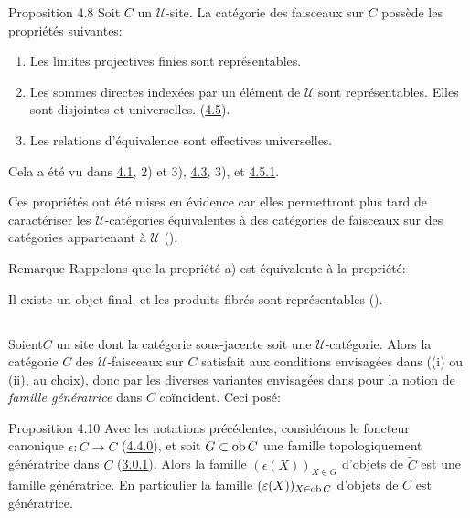 \documentclass[10pt]{../fichiers-configuration-latex/smfart}
\begin{document}
\begin{enonce*}{Proposition 4.8}
Soit $C$ un $𝒰$-site. La catégorie des faisceaux sur $C$
possède les propriétés suivantes:
\begin{enumerate}
\renewcommand{\theenumi}{\alph{enumi}}
\renewcommand{\labelenumi}{\theenumi)}
\item Les limites projectives finies sont représentables.

\item Les sommes directes indexées par un élément de $𝒰$
  sont représentables. Elles sont disjointes et
  universelles. (\hyperref[II.def4.5]{4.5}).

\item Les relations d'équivalence sont effectives universelles.
\end{enumerate}
\end{enonce*}

Cela a été vu dans \hyperref[II.theo4.1]{4.1}, 2) et 3), \hyperref[II.prop4.3]{4.3},
3), et \hyperref[II.exem4.5.1]{4.5.1}.

Ces propriétés ont été mises en évidence car elles
permettront plus tard de caractériser les $𝒰$-catégories
équivalentes à des catégories de faisceaux sur des catégories
appartenant à $𝒰$ ().

\begin{enonce*}[remark]{Remarque}
Rappelons que la propriété a) est équivalente à la
propriété:

Il existe un objet final, et les produits fibrés sont
représentables ().
\end{enonce*}

\setcounter{subsection}{8}
\subsection{}
Soient\pageoriginale $C$ un site dont la catégorie sous-jacente
soit une $𝒰$-catégorie. Alors la catégorie $C$ des
$𝒰$-faisceaux sur $C$ satisfait aux conditions envisagées
dans  ((i) ou (ii), au choix), donc par \loccit les
diverses variantes envisagées dans  pour la notion
de \emph{famille
  génératrice} dans $C$ coïncident. Ceci posé:

\begin{enonce*}{Proposition 4.10}
Avec les notations précédentes, considérons le foncteur
canonique $\epsilon:C\rightarrow \widetilde{C}$
(\hyperref[II.subsubsec4.4.0]{4.4.0}), et soit $G\subset \operatorname{ob} C$ une famille
topologiquement génératrice dans $C$ (\hyperref[II.def3.0.1]{3.0.1}). Alors
la famille $(\epsilon(X))_{X\in G}$ d'objets de $\widetilde{C}$ est
une famille génératrice. En particulier la famille
$(\varepsilon(X))_{X\in \operatorname{ob} C}$ d'objets de $C$ est génératrice.
\end{enonce*}
\end{document}
